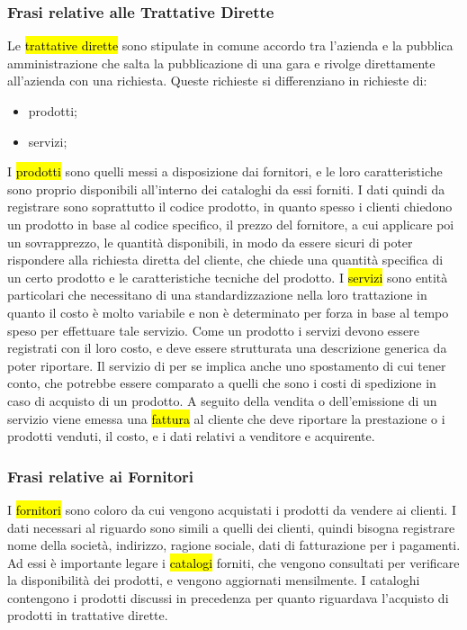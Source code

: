\subsubsection{Frasi relative alle Trattative Dirette}
Le \hl{trattative dirette} sono stipulate in comune accordo tra l'azienda e la pubblica amministrazione che salta la pubblicazione di una gara e rivolge direttamente all'azienda con una richiesta. Queste richieste si differenziano in richieste di:
\begin{itemize}
\item	prodotti;
\item	servizi;
\end{itemize}
I \hl{prodotti} sono quelli messi a disposizione dai fornitori, e le loro caratteristiche sono proprio disponibili all'interno dei cataloghi da essi forniti. I dati quindi da registrare sono soprattutto il codice prodotto, in quanto spesso i clienti chiedono un prodotto in base al codice specifico, il prezzo del fornitore, a cui applicare poi un sovrapprezzo, le quantità disponibili, in modo da essere sicuri di poter rispondere alla richiesta diretta del cliente, che chiede una quantità specifica di un certo prodotto e le caratteristiche tecniche del prodotto.\newline
I \hl{servizi} sono entità particolari che necessitano di una standardizzazione nella loro trattazione in quanto il costo è molto variabile e non è determinato per forza in base al tempo speso per effettuare tale servizio. Come un prodotto i servizi devono essere registrati con il loro costo, e deve essere strutturata una descrizione generica da poter riportare. Il servizio di per se implica anche uno spostamento di cui tener conto, che potrebbe essere comparato a quelli che sono i costi di spedizione in caso di acquisto di un prodotto.
A seguito della vendita o dell'emissione di un servizio viene emessa una \hl{fattura} al cliente che deve riportare la prestazione o i prodotti venduti, il costo, e i dati relativi a venditore e acquirente.

\subsubsection{Frasi relative ai Fornitori}
I \hl{fornitori} sono coloro da cui vengono acquistati i prodotti da vendere ai clienti. I dati necessari al riguardo sono simili a quelli dei clienti, quindi bisogna registrare nome della società, indirizzo, ragione sociale, dati di fatturazione per i pagamenti. Ad essi è importante legare i \hl{catalogi} forniti, che vengono consultati per verificare la disponibilità dei prodotti, e vengono aggiornati mensilmente. I cataloghi contengono i prodotti discussi in precedenza per quanto riguardava l'acquisto di prodotti in trattative dirette. 

